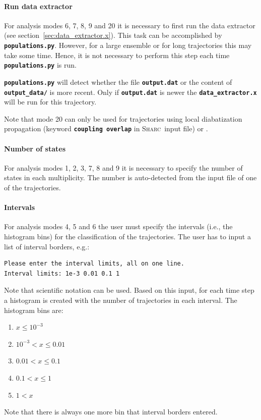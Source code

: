 \documentclass[a4paper,10pt,DIV=15,openany]{scrbook}
\newcommand{\sharc}{\textsc{Sharc}}
\newcommand{\ttt}[1]{\textbf{\texttt{#1}}}
\newenvironment{example}{
  \setlength{\OuterFrameSep}{3pt}
  \vspace{0mm}
  \definecolor{shadecolor}{HTML}{E4F4FF}
  \begin{shaded}
}{
  \end{shaded}
}
\begin{document}
\paragraph{Run data extractor}

For analysis modes 6, 7, 8, 9 and 20 it is necessary to first run the data extractor (see section~\ref{sec:data_extractor.x}). This task can be accomplished by \ttt{populations.py}. However, for a large ensemble or for long trajectories this may take some time. Hence, it is not necessary to perform this step each time \ttt{populations.py} is run. 

\ttt{populations.py} will detect whether the file \ttt{output.dat} or the content of \ttt{output\_data/} is more recent. Only if \ttt{output.dat} is newer the \ttt{data\_extractor.x} will be run for this trajectory.

Note that mode 20 can only be used for trajectories using local diabatization propagation (keyword \ttt{coupling overlap} in \sharc\ input file) or .

\paragraph{Number of states}

For analysis modes 1, 2, 3, 7, 8 and 9 it is necessary to specify the number of states in each multiplicity. The number is auto-detected from the input file of one of the trajectories.

\paragraph{Intervals}

For analysis modes 4, 5 and 6 the user must specify the intervals (i.e., the histogram bins) for the classification of the trajectories. The user has to input a list of interval borders, e.g.:
\begin{example}
\begin{verbatim}
Please enter the interval limits, all on one line.
Interval limits: 1e-3 0.01 0.1 1
\end{verbatim}
\end{example}

Note that scientific notation can be used. Based on this input, for each time step a histogram is created with the number of trajectories in each interval. The histogram bins are:
\begin{enumerate}
  \item $x\leq10^{-3}$
  \item $10^{-3}<x\leq0.01$
  \item $0.01<x\leq0.1$
  \item $0.1<x\leq1$
  \item $1<x$
\end{enumerate}
Note that there is always one more bin that interval borders entered.
\end{document}
